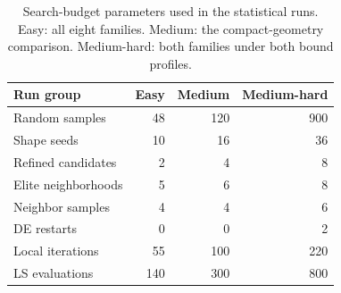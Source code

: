 \begin{table}[H]
\caption{Search-budget parameters used in the statistical runs. Easy: all eight families. Medium: the compact-geometry comparison. Medium-hard: both families under both bound profiles.}
\label{tab:search_budget}
\centering
\small
\setlength{\tabcolsep}{5pt}
\begin{tabular}{lrrr}
\hline
Run group & Easy & Medium & Medium-hard \\
\hline
Random samples & 48 & 120 & 900 \\
Shape seeds & 10 & 16 & 36 \\
Refined candidates & 2 & 4 & 8 \\
Elite neighborhoods & 5 & 6 & 8 \\
Neighbor samples & 4 & 4 & 6 \\
DE restarts & 0 & 0 & 2 \\
Local iterations & 55 & 100 & 220 \\
LS evaluations & 140 & 300 & 800 \\
\hline
\end{tabular}
\end{table}
